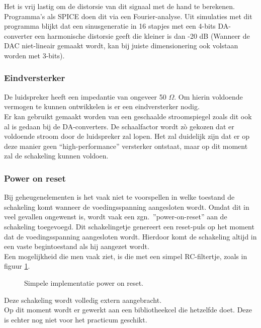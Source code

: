 Het is vrij lastig om de distorsie van dit signaal met de hand te berekenen.
Programma's als SPICE doen dit via een Fourier-analyse.
Uit simulaties met dit programma blijkt dat een sinusgeneratie in 16 stapjes
met een 4-bits DA-converter een harmonische distorsie geeft
die kleiner is dan -20 dB (Wanneer de DAC niet-lineair gemaakt wordt,
kan bij juiste dimensionering ook volstaan worden met 3-bits).


\subsubsection{Eindversterker}


De luidspreker heeft een impedantie van ongeveer 50 $\Omega$.
Om hierin voldoende vermogen te kunnen ontwikkelen is er een 
eindversterker nodig.\\
Er kan gebruikt gemaakt worden van een geschaalde stroomspiegel zoals dit ook al is gedaan bij de DA-converters.
De schaalfactor wordt z\`o gekozen dat er voldoende stroom door de luidspreker zal lopen.
Het zal duidelijk zijn dat er op deze manier geen ``high-performance'' versterker ontstaat, maar op dit moment zal de schakeling kunnen voldoen.


\subsubsection{Power on reset}


Bij geheugenelementen is het vaak niet te voorspellen in welke toestand de
schakeling komt wanneer de voedingsspanning aangesloten wordt. Omdat dit in
veel gevallen ongewenst is, wordt vaak een zgn.\ ''power-on-reset'' aan de
schakeling toegevoegd. Dit schakelingetje genereert een reset-puls op het
moment dat de voedingsspanning aangesloten wordt. Hierdoor komt de
schakeling altijd in een vaste begintoestand als hij aangezet wordt.\\
Een mogelijkheid die men vaak ziet, is die met een simpel RC-filtertje, zoals in figuur \ref{por}. 




\begin{figure}[bth]
\centerline{}
\caption{Simpele implementatie power on reset.}
\label{por}
\end{figure}

Deze schakeling wordt volledig extern aangebracht.\\
Op dit moment wordt er gewerkt aan een bibliotheekcel die hetzelfde doet. Deze is echter nog niet voor het practicum geschikt.

\cleardoublepage

